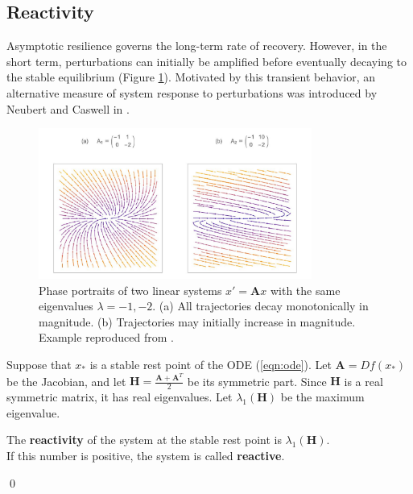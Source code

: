 \subsection{Reactivity}
Asymptotic resilience governs the long-term rate of recovery. However, in the short term, perturbations can initially be amplified before eventually decaying to the stable equilibrium (Figure \ref{fig:reactivity}). Motivated by this transient behavior, an alternative measure of system response to perturbations was introduced by Neubert and Caswell in \cite{neubertAlternativesResilienceMeasuring1997a}.

\begin{figure}[ht]
	\centering
	\captionsetup{width=0.8\linewidth}
	\includegraphics[width=0.8\textwidth]{figs/positive_reactivity_real_example}
	\caption{Phase portraits of two linear systems $x' = \textbf{A}x$ with the same eigenvalues  $\lambda = -1, -2$. (a) All trajectories decay monotonically in magnitude. (b) Trajectories may initially increase in magnitude. Example reproduced from \cite{neubertAlternativesResilienceMeasuring1997a}.}
	
	\label{fig:reactivity}
\end{figure} 

\begin{definition}
	Suppose that $x_\ast$ is a stable rest point of the ODE (\ref{eqn:ode}). Let $\textbf{A} = Df(x_\ast)$ be the Jacobian, and let $\textbf{H} = \frac{\textbf{A}+\textbf{A}^T}{2}$ be its symmetric part. Since $\textbf{H}$ is a real symmetric matrix, it has real eigenvalues. Let $\lambda_1(\textbf{H})$ be the maximum eigenvalue.
	
	 \begin{center}
	 	The \textbf{reactivity} of the system at the stable rest point is $\lambda_1(\mathbf{H})$.\\ If this number is positive, the system is called \textbf{reactive}.
	 \end{center}
	
	\qed
\end{definition}

